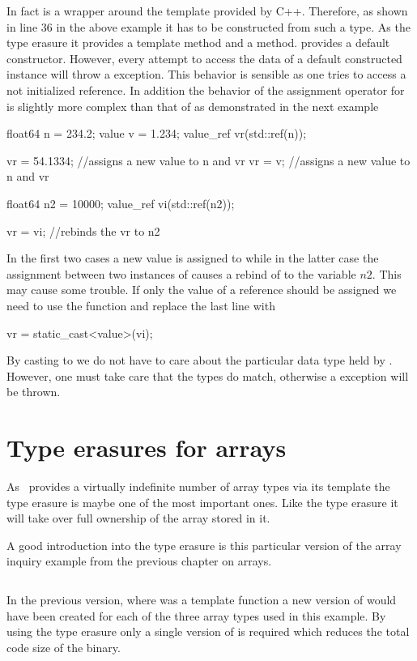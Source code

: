 In fact  is a wrapper around the  
template provided by C++. Therefore, as shown in line $36$ in the above example
it has to be constructed from such a type. 
As the  type erasure it provides a  template method and a
 method.
 provides a default constructor. However, every attempt to 
access the data of a default constructed  instance will throw
a  exception. This behavior is sensible as one 
tries to access a not initialized reference. In addition the behavior of the 
assignment operator for  is slightly more complex than that of 
 as demonstrated in the next example
\begin{cppcode}
float64 n = 234.2;
value v = 1.234;
value_ref vr(std::ref(n));

vr = 54.1334; //assigns a new value to n and vr
vr = v;       //assigns a new value to n and vr

float64 n2 = 10000;
value_ref vi(std::ref(n2));

vr = vi;      //rebinds the vr to n2
\end{cppcode}
In the first two cases a new value is assigned to  while in the latter
case the assignment between two instances of  causes a rebind of
 to the variable $n2$. This may cause some trouble. If only the value of
a reference should be assigned we need to use the  function
and replace the last line with
\begin{cppcode}
vr = static_cast<value>(vi);
\end{cppcode}
By casting to   we do not have to care about the particular data type
held by . However, one must take care that the types do match, otherwise
a  exception will be thrown.

\section{Type erasures for arrays}

As \libpnicore\ provides a virtually indefinite number of array types via its
 template the  type erasure is maybe one of the most
important ones. Like the  type erasure it will take over full
ownership of the array stored in it.

A good introduction into the  type erasure is this particular version
of the array inquiry  example from the previous chapter on arrays. 
\inputminted[linenos,
             fontsize=\small,
             firstnumber=25,
             firstline=25,
             lastline=62,
             frame=lines,
             label=examples/type\_erasure3.cpp]
{cpp}{../examples/type_erasure3.cpp}
In the previous version, where  was a template function a new
version of  would have been created for each of the three array
types used in this example. By using the type erasure only a single version of
 is required which reduces the total code size of the binary.

